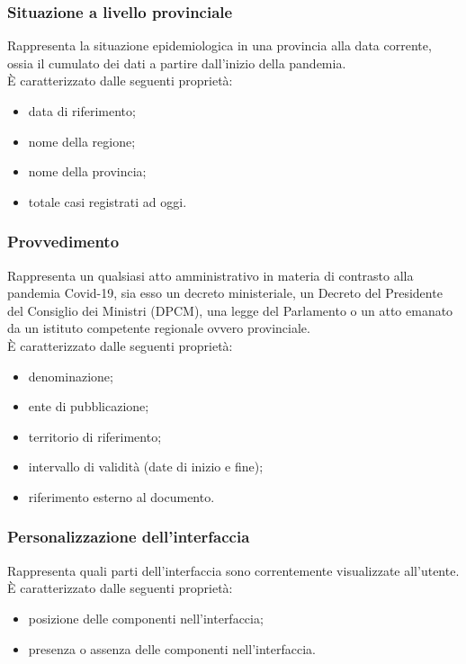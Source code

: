 \subsubsection{Situazione a livello provinciale}
\label{sss:situazione-livello-provinciale}
Rappresenta la situazione epidemiologica in una provincia alla data corrente, ossia il cumulato dei dati a partire dall'inizio della pandemia.\\
È caratterizzato dalle seguenti proprietà:
\begin{itemize}
    \item data di riferimento;
    \item nome della regione;
    \item nome della provincia;
    \item totale casi registrati ad oggi.
\end{itemize}

\subsubsection{Provvedimento}
\label{sss:provvedimento}
Rappresenta un qualsiasi atto amministrativo in materia di contrasto alla pandemia Covid-19, sia esso un decreto ministeriale, un Decreto del Presidente del Consiglio dei Ministri (DPCM), una legge del Parlamento o un atto emanato da un istituto competente regionale ovvero provinciale.\\
È caratterizzato dalle seguenti proprietà:
\begin{itemize}
    \item denominazione;
    \item ente di pubblicazione;
    \item territorio di riferimento;
    \item intervallo di validità (date di inizio e fine);
    \item riferimento esterno al documento.
\end{itemize}

\subsubsection{Personalizzazione dell'interfaccia}
\label{sss:personalizzazione-interfaccia}
Rappresenta quali parti dell'interfaccia sono correntemente visualizzate all'utente.\\
È caratterizzato dalle seguenti proprietà:
\begin{itemize}
    \item posizione delle componenti nell'interfaccia;
    \item presenza o assenza delle componenti nell'interfaccia.
\end{itemize}
